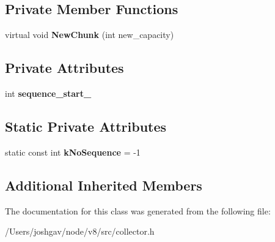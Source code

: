 \subsection*{Private Member Functions}
\begin{DoxyCompactItemize}
\item 
virtual void {\bfseries New\+Chunk} (int new\+\_\+capacity)\hypertarget{classv8_1_1internal_1_1_sequence_collector_aca8922ab12a0ec960b5d2caa7f6433ec}{}\label{classv8_1_1internal_1_1_sequence_collector_aca8922ab12a0ec960b5d2caa7f6433ec}

\end{DoxyCompactItemize}
\subsection*{Private Attributes}
\begin{DoxyCompactItemize}
\item 
int {\bfseries sequence\+\_\+start\+\_\+}\hypertarget{classv8_1_1internal_1_1_sequence_collector_a9f971ec3ecf045273d8dcaa0b85274a3}{}\label{classv8_1_1internal_1_1_sequence_collector_a9f971ec3ecf045273d8dcaa0b85274a3}

\end{DoxyCompactItemize}
\subsection*{Static Private Attributes}
\begin{DoxyCompactItemize}
\item 
static const int {\bfseries k\+No\+Sequence} = -\/1\hypertarget{classv8_1_1internal_1_1_sequence_collector_a0447a3333a80d669ef9aeb9132061fd4}{}\label{classv8_1_1internal_1_1_sequence_collector_a0447a3333a80d669ef9aeb9132061fd4}

\end{DoxyCompactItemize}
\subsection*{Additional Inherited Members}


The documentation for this class was generated from the following file\+:\begin{DoxyCompactItemize}
\item 
/\+Users/joshgav/node/v8/src/collector.\+h\end{DoxyCompactItemize}
